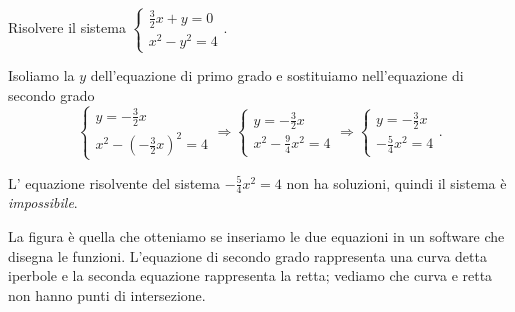 \begin{esempio}{}{}
Risolvere il sistema \(\left\{\begin{array}{l}\frac 3 
2x+y=0\\x^2-y^2=4\end{array}\right..\)

Isoliamo la \(y\) dell'equazione di primo grado e sostituiamo nell'equazione di 
secondo grado 
\[\left\{\begin{array}{l}y=-\frac 3 2x \\
x^2-\left(-\frac 3 2x\right)^2=4\end{array}\right.
\Rightarrow \left\{\begin{array}{l}y=-\frac 3 2x \\
x^2-\frac 9 4x^2=4\end{array}\right.
\Rightarrow \left\{\begin{array}{l}y=-\frac 3 2x\\
-\frac 5 4x^2=4\end{array}\right..\]

L' equazione risolvente del sistema \(-\frac 5 4x^2=4\) non ha soluzioni, quindi 
il sistema è \emph{impossibile}.
\begin{htmulticols}{2}
La figura è quella che otteniamo se inseriamo le due equazioni in un software 
che disegna le funzioni. L'equazione di secondo grado rappresenta una curva 
detta iperbole e la seconda equazione rappresenta la retta; vediamo che curva e 
retta non hanno punti di intersezione.
\begin{center}

\end{center}
\end{htmulticols}
\end{esempio}

